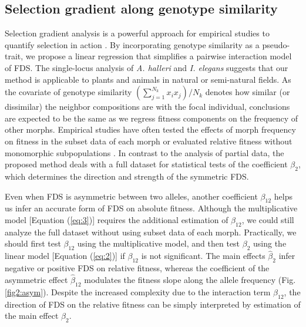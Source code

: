 \documentclass[12pt,]{article}
\begin{document}
\subsection{Selection gradient along genotype similarity}
Selection gradient analysis is a powerful approach for empirical studies to quantify selection in action \citep{lande1983measurement, mitchell1987regression, chong2018note}. By incorporating genotype similarity as a pseudo-trait, we propose a linear regression that simplifies a pairwise interaction model of FDS. The single-locus analysis of \textit{A. halleri} and \textit{I. elegans} suggests that our method is applicable to plants and animals in natural or semi-natural fields. As the covariate of genotype similarity $(\sum^{N_k}_{j=1}x_i x_j)/N_k$ denotes how similar (or dissimilar) the neighbor compositions are with the focal individual, conclusions are expected to be the same as we regress fitness components on the frequency of other morphs. Empirical studies have often tested the effects of morph frequency on fitness in the subset data of each morph \citep{mccauley1998frequency, bennington1998field, sato2017herbivore} or evaluated relative fitness without monomorphic subpopulations \citep{gigord2001negative, takahashi2010negative}. In contrast to the analysis of partial data, the proposed method deals with a full dataset for statistical tests of the coefficient $\beta_2$, which determines the direction and strength of the symmetric FDS.

Even when FDS is asymmetric between two alleles, another coefficient $\beta_{12}$ helps us infer an accurate form of FDS on absolute fitness. Although the multiplicative model [Equation (\ref{eq:3})] requires the additional estimation of $\beta_{12}$, we could still analyze the full dataset without using subset data of each morph. Practically, we should first test $\beta_{12}$ using the multiplicative model, and then test $\beta_2$ using the linear model [Equation (\ref{eq:2})] if $\beta_{12}$ is not significant. The main effects $\hat{\beta}_{2}$ infer negative or positive FDS on relative fitness, whereas the coefficient of the asymmetric effect $\hat{\beta}_{12}$ modulates the fitness slope along the allele frequency (Fig. \ref{fig2:asym}). Despite the increased complexity due to the interaction term $\beta_{12}$, the direction of FDS on the relative fitness can be simply interpreted by estimation of the main effect $\beta_2$.
\end{document}

